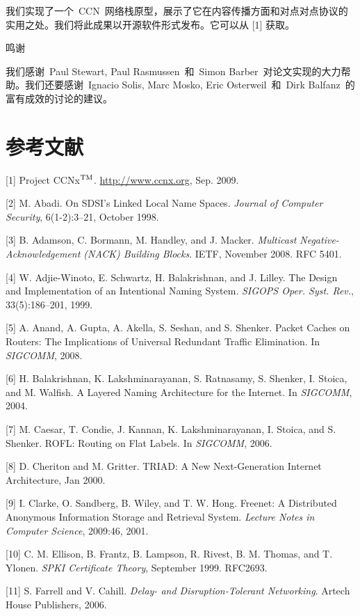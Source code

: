 我们实现了一个~CCN~网络栈原型，展示了它在内容传播方面和对点对点协议的实用之处。我们将此成果以开源软件形式发布。它可以从 [1] 获取。

\heiti
鸣谢

\songti
我们感谢~Paul Stewart, Paul Rasmussen~和~Simon Barber~对论文实现的大力帮助。我们还要感谢~Ignacio Solis, Marc Mosko, Eric Osterweil~和~Dirk Balfanz~的富有成效的讨论的建议。

\section{参考文献}
\def\tm{\leavevmode\hbox{$\rm {}^{TM}$}} %
[1] Project CCNx\tm. \url{http://www.ccnx.org}, Sep. 2009.

[2] M. Abadi. On SDSI’s Linked Local Name Spaces. \emph{Journal of Computer Security}, 6(1-2):3–21, October 1998.

[3] B. Adamson, C. Bormann, M. Handley, and J. Macker.
\emph{Multicast Negative-Acknowledgement (NACK) Building
Blocks}. IETF, November 2008. RFC 5401.

[4] W. Adjie-Winoto, E. Schwartz, H. Balakrishnan, and
J. Lilley. The Design and Implementation of an Intentional Naming System. \emph{SIGOPS Oper. Syst. Rev.}, 33(5):186–201, 1999.

[5] A. Anand, A. Gupta, A. Akella, S. Seshan, and S. Shenker. Packet Caches on Routers: The Implications of Universal Redundant Traffic Elimination. In \emph{SIGCOMM}, 2008.

[6] H. Balakrishnan, K. Lakshminarayanan, S. Ratnasamy, S. Shenker, I. Stoica, and M. Walfish. A Layered Naming Architecture for the Internet. In \emph{SIGCOMM}, 2004.

[7] M. Caesar, T. Condie, J. Kannan, K. Lakshminarayanan,
I. Stoica, and S. Shenker. ROFL: Routing on Flat Labels. In \emph{SIGCOMM}, 2006.

[8] D. Cheriton and M. Gritter. TRIAD: A New Next-Generation Internet Architecture, Jan 2000.

[9] I. Clarke, O. Sandberg, B. Wiley, and T. W. Hong. Freenet: A Distributed Anonymous Information Storage and Retrieval System. \emph{Lecture Notes in Computer Science}, 2009:46, 2001.

[10] C. M. Ellison, B. Frantz, B. Lampson, R. Rivest, B. M. Thomas, and T. Ylonen. \emph{SPKI Certificate Theory}, September 1999. RFC2693.

[11] S. Farrell and V. Cahill. \emph{Delay- and Disruption-Tolerant Networking}. Artech House Publishers, 2006.

